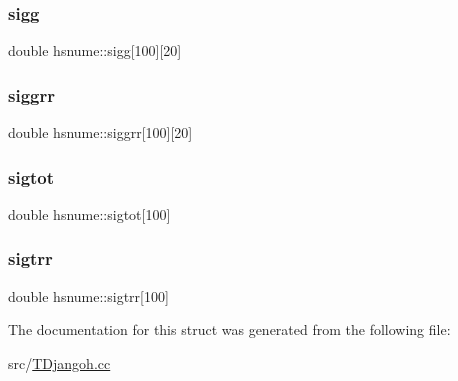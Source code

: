 \mbox{\label{structhsnume_ac93f70a358747045cf8ad44b4dc8629a}} 
\subsubsection{\texorpdfstring{sigg}{sigg}}
{\footnotesize\ttfamily double hsnume\+::sigg\mbox{[}100\mbox{]}\mbox{[}20\mbox{]}}

\mbox{\label{structhsnume_a3ba45f1bca6667dd97aa973c7a93b373}} 
\subsubsection{\texorpdfstring{siggrr}{siggrr}}
{\footnotesize\ttfamily double hsnume\+::siggrr\mbox{[}100\mbox{]}\mbox{[}20\mbox{]}}

\mbox{\label{structhsnume_ad83b273fb9a02cf1faf3031d209e0ce1}} 
\subsubsection{\texorpdfstring{sigtot}{sigtot}}
{\footnotesize\ttfamily double hsnume\+::sigtot\mbox{[}100\mbox{]}}

\mbox{\label{structhsnume_a76bc97de817d06e5b6ee2f0bc37ad7dd}} 
\subsubsection{\texorpdfstring{sigtrr}{sigtrr}}
{\footnotesize\ttfamily double hsnume\+::sigtrr\mbox{[}100\mbox{]}}



The documentation for this struct was generated from the following file\+:\begin{DoxyCompactItemize}
\item 
src/\hyperlink{_t_djangoh_8cc}{T\+Djangoh.\+cc}\end{DoxyCompactItemize}
